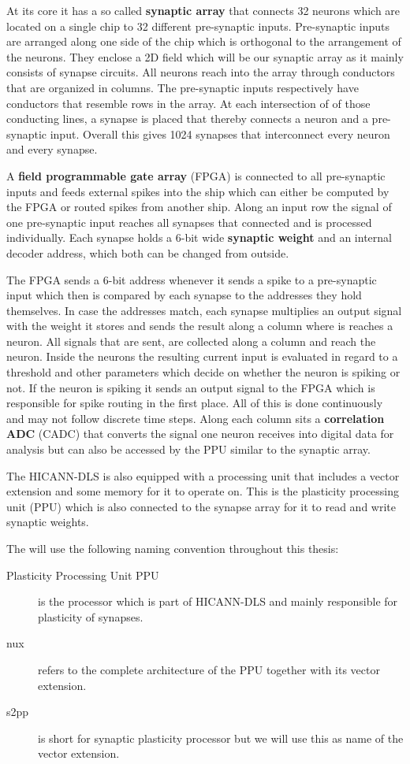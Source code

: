 At its core it has a so called \textbf{synaptic array} that connects 32 neurons which are located on a single chip to 32 different pre-synaptic inputs.
Pre-synaptic inputs are arranged along one side of the chip which is orthogonal to the arrangement of the neurons.
They enclose a 2D field which will be our synaptic array as it mainly consists of synapse circuits.
All neurons reach into the array through conductors that are organized in columns.
The pre-synaptic inputs respectively have conductors that resemble rows in the array.
At each intersection of of those conducting lines, a synapse is placed that thereby connects a neuron and a pre-synaptic input.
Overall this gives 1024 synapses that interconnect every neuron and every synapse.

A \textbf{field programmable gate array} (FPGA) is connected to all pre-synaptic inputs and feeds external spikes into the ship which can either be computed by the FPGA or routed spikes from another ship.
Along an input row the signal of one pre-synaptic input reaches all synapses that connected and is processed individually.
Each synapse holds a 6-bit wide \textbf{synaptic weight} and an internal decoder address, which both can be changed from outside.

The FPGA sends a 6-bit address whenever it sends a spike to a pre-synaptic input which then is compared by each synapse to the addresses they hold themselves.
In case the addresses match, each synapse multiplies an output signal with the weight it stores and sends the result along a column where is reaches a neuron.
All signals that are sent, are collected along a column and reach the neuron.
Inside the neurons the resulting current input is evaluated in regard to a threshold and other parameters which decide on whether the neuron is spiking or not.
If the neuron is spiking it sends an output signal to the FPGA which is responsible for spike routing in the first place.
All of this is done continuously and may not follow discrete time steps.
Along each column sits a \textbf{correlation ADC} (CADC) that converts the signal one neuron receives into digital data for analysis but can also be accessed by the PPU similar to the synaptic array.

The HICANN-DLS is also equipped with a processing unit that includes a vector extension and some memory for it to operate on.
This is the plasticity processing unit (PPU) which is also connected to the synapse array for it to read and write synaptic weights.

The will use the following naming convention throughout this thesis:
\begin{description}
    \item[Plasticity Processing Unit PPU] is the processor which is part of HICANN-DLS and mainly responsible for plasticity of synapses.
    \item[nux] refers to the complete architecture of the PPU together with its vector extension.
    \item[s2pp] is short for synaptic plasticity processor but we will use this as name of the vector extension.
\end{description}

